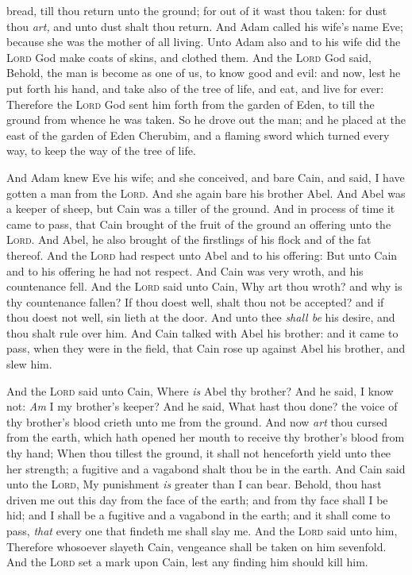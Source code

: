 \documentclass[11pt,letterpaper,oneside]{memoir}
\begin{document}
bread, till thou return unto the ground; for out of it wast thou taken:
for dust thou \emph{art,} and unto dust shalt thou return. And Adam
called his wife's name Eve; because she was the mother of all living.
Unto Adam also and to his wife did the \textsc{Lord} God make coats of
skins, and clothed them. And the \textsc{Lord} God said, Behold, the man
is become as one of us, to know good and evil: and now, lest he put
forth his hand, and take also of the tree of life, and eat, and live for
ever: Therefore the \textsc{Lord} God sent him forth from the garden of
Eden, to till the ground from whence he was taken. So he drove out the
man; and he placed at the east of the garden of Eden Cherubim, and a
flaming sword which turned every way, to keep the way of the tree of
life.

And Adam knew Eve his wife; and she conceived, and bare Cain, and said,
I have gotten a man from the \textsc{Lord}. And she again bare his brother
Abel. And Abel was a keeper of sheep, but Cain was a tiller of the
ground. And in process of time it came to pass, that Cain brought of the
fruit of the ground an offering unto the \textsc{Lord}. And Abel, he also
brought of the firstlings of his flock and of the fat thereof. And the
\textsc{Lord} had respect unto Abel and to his offering: But unto Cain and
to his offering he had not respect. And Cain was very wroth, and his
countenance fell. And the \textsc{Lord} said unto Cain, Why art thou
wroth? and why is thy countenance fallen? If thou doest well, shalt thou
not be accepted? and if thou doest not well, sin lieth at the door. And
unto thee \emph{shall be} his desire, and thou shalt rule over him. And
Cain talked with Abel his brother: and it came to pass, when they were
in the field, that Cain rose up against Abel his brother, and slew him.

And the \textsc{Lord} said unto Cain, Where \emph{is} Abel thy brother?
And he said, I know not: \emph{Am} I my brother's keeper? And he said,
What hast thou done? the voice of thy brother's blood crieth unto me
from the ground. And now \emph{art} thou cursed from the earth, which
hath opened her mouth to receive thy brother's blood from thy hand; When
thou tillest the ground, it shall not henceforth yield unto thee her
strength; a fugitive and a vagabond shalt thou be in the earth. And Cain
said unto the \textsc{Lord}, My punishment \emph{is} greater than I can
bear. Behold, thou hast driven me out this day from the face of the
earth; and from thy face shall I be hid; and I shall be a fugitive and a
vagabond in the earth; and it shall come to pass, \emph{that} every one
that findeth me shall slay me. And the \textsc{Lord} said unto him,
Therefore whosoever slayeth Cain, vengeance shall be taken on him
sevenfold. And the \textsc{Lord} set a mark upon Cain, lest any finding
him should kill him.
\end{document}
